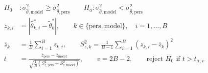\begin{align*}
    H_0&: \sigma^2_{\hat{\theta},\text{model}} \geq \sigma^2_{\hat{\theta},\text{pers}}
    \qquad H_a: \sigma^2_{\hat{\theta},\text{model}} < \sigma^2_{\hat{\theta},\text{pers}}\\[6pt]
    z_{k,i} &= \left|\hat{\theta}_{k,i}^* - \tilde{\theta}_k^*\right|, \qquad k \in \{\text{pers}, \text{model}\}, \quad i = 1, \dots, B\\[6pt]
    \bar{z}_{k} &= \frac{1}{B}\sum_{i=1}^{B} z_{k,i}, \qquad
    S^2_{z,k} = \frac{1}{B-1}\sum_{i=1}^{B}\left(z_{k,i} - \bar{z}_k\right)^2\\[6pt]
    t &= \frac{\bar{z}_{\text{pers}} - \bar{z}_{\text{model}}}{\sqrt{\frac{1}{B}\left(S_{z,\text{pers}}^2 + S_{z,\text{model}}^2\right)}}, \qquad v = 2B - 2, \qquad \text{reject } H_0 \text{ if } t > t_{\alpha, v}
\end{align*}
